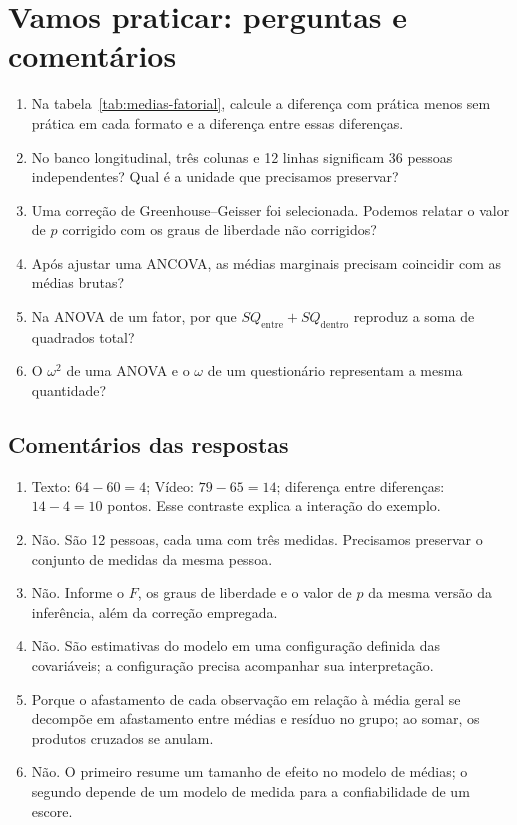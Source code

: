 \section{Vamos praticar: perguntas e comentários}

\begin{enumerate}
  \item Na tabela~\ref{tab:medias-fatorial}, calcule a diferença com prática menos sem prática em cada formato e a diferença entre essas diferenças.
  \item No banco longitudinal, três colunas e 12 linhas significam 36 pessoas independentes? Qual é a unidade que precisamos preservar?
  \item Uma correção de Greenhouse--Geisser foi selecionada. Podemos relatar o valor de $p$ corrigido com os graus de liberdade não corrigidos?
  \item Após ajustar uma ANCOVA, as médias marginais precisam coincidir com as médias brutas?
  \item Na ANOVA de um fator, por que $SQ_{\mathrm{entre}}+SQ_{\mathrm{dentro}}$ reproduz a soma de quadrados total?
  \item O $\omega^2$ de uma ANOVA e o $\omega$ de um questionário representam a mesma quantidade?
\end{enumerate}

\subsection*{Comentários das respostas}

\begin{enumerate}
  \item Texto: $64-60=4$; Vídeo: $79-65=14$; diferença entre diferenças: $14-4=10$ pontos. Esse contraste explica a interação do exemplo.
  \item Não. São 12 pessoas, cada uma com três medidas. Precisamos preservar o conjunto de medidas da mesma pessoa.
  \item Não. Informe o $F$, os graus de liberdade e o valor de $p$ da mesma versão da inferência, além da correção empregada.
  \item Não. São estimativas do modelo em uma configuração definida das covariáveis; a configuração precisa acompanhar sua interpretação.
  \item Porque o afastamento de cada observação em relação à média geral se decompõe em afastamento entre médias e resíduo no grupo; ao somar, os produtos cruzados se anulam.
  \item Não. O primeiro resume um tamanho de efeito no modelo de médias; o segundo depende de um modelo de medida para a confiabilidade de um escore.
\end{enumerate}

